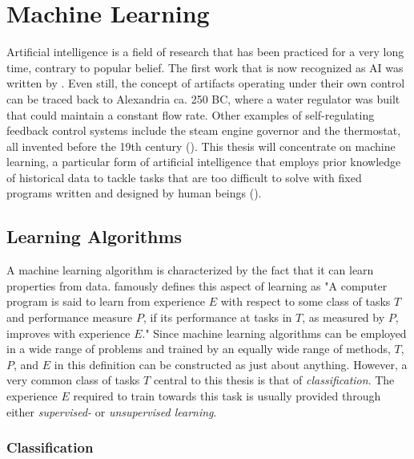\section{Machine Learning} \label{sec:bt_ArtificialIntelligence}

Artificial intelligence is a field of research that has been practiced for a very long time, contrary to popular belief. The first work that is now recognized as AI was written by \cite{mcculloch1943}. Even still, the concept of artifacts operating under their own control can be traced back to Alexandria ca. 250 BC, where a water regulator was built that could maintain a constant flow rate. Other examples of self-regulating feedback control systems include the steam engine governor and the thermostat, all invented before the 19th century (\cite{russell2009}). This thesis will concentrate on machine learning, a particular form of artificial intelligence that employs prior knowledge of historical data to tackle tasks that are too difficult to solve with fixed programs written and designed by human beings (\cite{goodfellow2016}).

\subsection{Learning Algorithms}

A machine learning algorithm is characterized by the fact that it can learn properties from data. \cite{mitchell1997} famously defines this aspect of learning as "A computer program is said to learn from experience $E$ with respect to some class of tasks $T$ and performance measure $P$, if its performance at tasks in $T$, as measured by $P$, improves with experience $E$." Since machine learning algorithms can be employed in a wide range of problems and trained by an equally wide range of methods, $T$, $P$, and $E$ in this definition can be constructed as just about anything. However, a very common class of tasks $T$ central to this thesis is that of \textit{classification}. The experience $E$ required to train towards this task is usually provided through either \textit{supervised-} or \textit{unsupervised learning}. 

\subsubsection{Classification}

